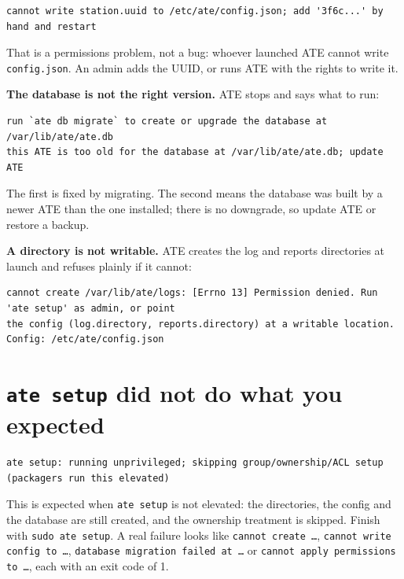\begin{lstlisting}[language=ATEShell]
cannot write station.uuid to /etc/ate/config.json; add '3f6c...' by hand and restart
\end{lstlisting}

That is a permissions problem, not a bug: whoever launched ATE cannot write \texttt{config.json}. An
admin adds the UUID, or runs ATE with the rights to write it.

\textbf{The database is not the right version.} ATE stops and says what to run:

\begin{lstlisting}[language=ATEShell]
run `ate db migrate` to create or upgrade the database at /var/lib/ate/ate.db
this ATE is too old for the database at /var/lib/ate/ate.db; update ATE
\end{lstlisting}

The first is fixed by migrating. The second means the database was built by a newer ATE than the one
installed; there is no downgrade, so update ATE or restore a backup.

\textbf{A directory is not writable.} ATE creates the log and reports directories at launch and
refuses plainly if it cannot:

\begin{lstlisting}[language=ATEShell]
cannot create /var/lib/ate/logs: [Errno 13] Permission denied. Run 'ate setup' as admin, or point
the config (log.directory, reports.directory) at a writable location. Config: /etc/ate/config.json
\end{lstlisting}

\section{\texttt{ate setup} did not do what you expected}

\begin{lstlisting}[language=ATEShell]
ate setup: running unprivileged; skipping group/ownership/ACL setup (packagers run this elevated)
\end{lstlisting}

This is expected when \texttt{ate setup} is not elevated: the directories, the config and the
database are still created, and the ownership treatment is skipped. Finish with
\texttt{sudo ate setup}. A real failure looks like \texttt{cannot create \dots}, \texttt{cannot write
config to \dots}, \texttt{database migration failed at \dots} or \texttt{cannot apply permissions to
\dots}, each with an exit code of 1.

